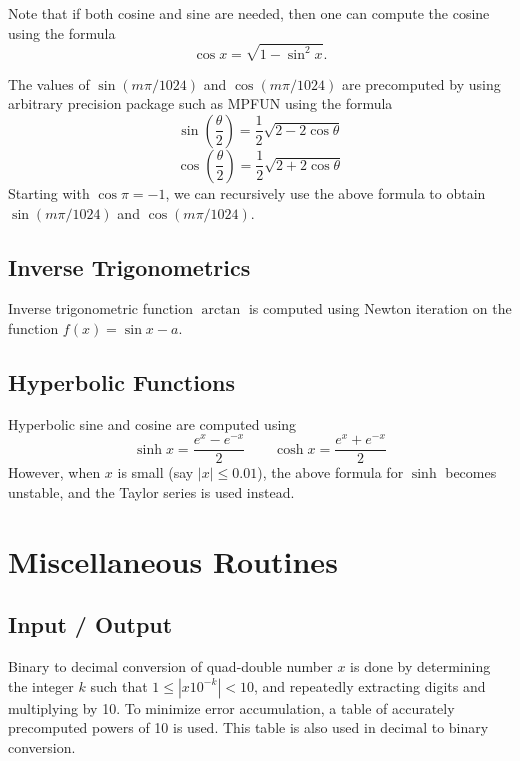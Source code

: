 \documentclass[11pt]{article}
\theoremstyle{definition}
\begin{document}
Note that if both cosine and sine are needed, then one can compute
the cosine using the formula 
\begin{displaymath}
  \cos x = \sqrt{1 - \sin^2 x}.
\end{displaymath}

The values of $\sin (m \pi / 1024)$ and $\cos (m \pi / 1024)$ are
precomputed by using arbitrary precision package such as MPFUN \cite{bai-mp}
using the formula
\begin{displaymath}
    \sin \left( \frac{\theta}{2} \right) = 
    \frac{1}{2} \sqrt{2 - 2 \cos \theta}
\end{displaymath}
\begin{displaymath}
    \cos \left( \frac{\theta}{2} \right) = 
    \frac{1}{2} \sqrt{2 + 2 \cos \theta}
\end{displaymath}
Starting with $\cos \pi = -1$, we can recursively use the above formula
to obtain $\sin (m \pi / 1024)$ and $\cos (m \pi / 1024)$.

\subsection{Inverse Trigonometrics}
Inverse trigonometric function $\arctan$ is computed using Newton
iteration on the function $f(x) = \sin x - a$.

\subsection{Hyperbolic Functions}
Hyperbolic sine and cosine are computed using
\begin{displaymath} 
  \sinh x = \frac{e^x - e^{-x}}{2} \qquad \cosh x = \frac{e^x + e^{-x}}{2}
\end{displaymath}
However, when $x$ is small (say $|x| \le 0.01$), the above formula for 
$\sinh$ becomes unstable, and the Taylor series is used instead.

\section{Miscellaneous Routines} \label{sec:misc}
\subsection{Input / Output}
  Binary to decimal conversion of quad-double number $x$ is done by 
determining the integer $k$ such that $1 \le |x 10^{-k}| < 10$, 
and repeatedly extracting digits and multiplying by 10.  To minimize
error accumulation, a table of accurately precomputed powers of 10
is used.  This table is also used in decimal to binary conversion.
\end{document}
